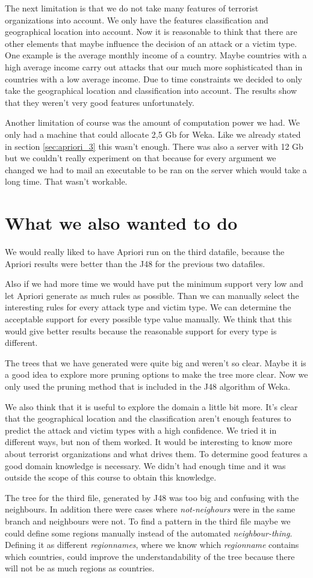 \documentclass[a4]{article}
\begin{document}
The next limitation is that we do not take many features of terrorist organizations into account. We only have the features classification and geographical location into account. Now it is reasonable to think that there are other elements that maybe influence the decision of an attack or a victim type. One example is the average monthly income of a country. Maybe countries with a high average income carry out attacks that our much more sophisticated than in countries with a low average income. Due to time constraints we decided to only take the geographical location and classification into account. The results show that they weren't very good features unfortunately.\par
Another limitation of course was the amount of computation power we had. We only had a machine that could allocate 2,5 Gb for Weka. Like we already stated in section \ref{sec:apriori_3} this wasn't enough. There was also a server with 12 Gb but we couldn't really experiment on that because for every argument we changed we had to mail an executable to be ran on the server which would take a long time. That wasn't workable.
\section{What we also wanted to do}
We would really liked to have Apriori run on the third datafile, because the Apriori results were better than the J48 for the previous two datafiles.\par Also if we had more time we would have put the minimum support very low and let Apriori generate as much rules as possible. Than we can manually select the interesting rules for every attack type and victim type. We can determine the acceptable support for every possible type value manually. We think that this would give better results because the reasonable support for every type is different.\par
The trees that we have generated were quite big and weren't so clear. Maybe it is a good idea to explore more pruning options to make the tree more clear. Now we only used the pruning method that is included in the J48 algorithm of Weka.\par
We also think that it is useful to explore the domain a little bit more. It's clear that the geographical location and the classification aren't enough features to predict the attack and victim types with a high confidence. We tried it in different ways, but non of them worked. It would be interesting to know more about terrorist organizations and what drives them. To determine good features a good domain knowledge is necessary. We didn't had enough time and it was outside the scope of this course to obtain this knowledge.
\par
The tree for the third file, generated by J48 was too big and confusing with the neighbours.
In addition there were cases where \textit{not-neighours} were in the same branch and neighbours were not.
To find a pattern in the third file maybe we could define some regions manually instead of the automated \textit{neighbour-thing}.
Defining it as different \textit{regionnames}, where we know which \textit{regionname} contains which countries, could improve the understandability of the tree because there will not be as much regions as countries.
\end{document}
